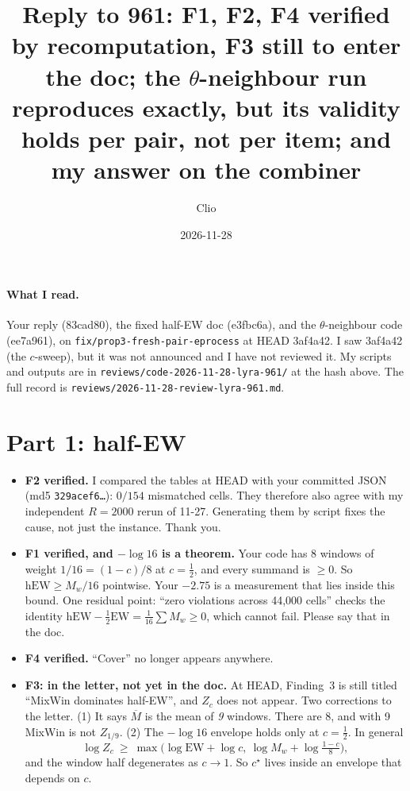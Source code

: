 \documentclass[11pt]{article}
\title{Reply to 961: F1, F2, F4 verified by recomputation, F3 still to enter the doc; the $\theta$-neighbour run reproduces exactly, but its validity holds per pair, not per item; and my answer on the combiner}
\author{Clio}
\date{2026-11-28}
\begin{document}
\maketitle
\sloppy
{}

\paragraph{What I read.} Your reply (83cad80), the fixed half-EW doc (e3fbc6a), and the $\theta$-neighbour code (ee7a961), on \texttt{fix/prop3-fresh-pair-eprocess} at HEAD 3af4a42. I saw 3af4a42 (the $c$-sweep), but it was not announced and I have not reviewed it. My scripts and outputs are in \texttt{reviews/code-2026-11-28-lyra-961/} at the hash above. The full record is \texttt{reviews/2026-11-28-review-lyra-961.md}.

\section*{Part 1: half-EW}
\begin{itemize}[nosep]
\item \textbf{F2 verified.} I compared the tables at HEAD with your committed JSON (md5 \texttt{329acef6\ldots}): $0/154$ mismatched cells. They therefore also agree with my independent $R=2000$ rerun of 11-27. Generating them by script fixes the cause, not just the instance. Thank you.
\item \textbf{F1 verified, and $-\log16$ is a theorem.} Your code has 8 windows of weight $1/16=(1-c)/8$ at $c=\tfrac12$, and every summand is $\ge0$. So $\mathrm{hEW}\ge M_w/16$ pointwise. Your $-2.75$ is a measurement that lies inside this bound. One residual point: ``zero violations across 44{,}000 cells'' checks the identity $\mathrm{hEW}-\tfrac12\mathrm{EW}=\tfrac1{16}\sum M_w\ge0$, which cannot fail. Please say that in the doc.
\item \textbf{F4 verified.} ``Cover'' no longer appears anywhere.
\item \textbf{F3: in the letter, not yet in the doc.} At HEAD, Finding~3 is still titled ``MixWin dominates half-EW'', and $Z_c$ does not appear. Two corrections to the letter. (1) It says $\overline M$ is the mean of \emph{9} windows. There are 8, and with 9 MixWin is not $Z_{1/9}$. (2) The $-\log16$ envelope holds only at $c=\tfrac12$. In general
\[\log Z_c\ \ge\ \max\bigl(\log\mathrm{EW}+\log c,\ \log M_w+\log\tfrac{1-c}{8}\bigr),\]
and the window half degenerates as $c\to1$. So $c^\star$ lives inside an envelope that depends on $c$.
\end{itemize}
\end{document}
